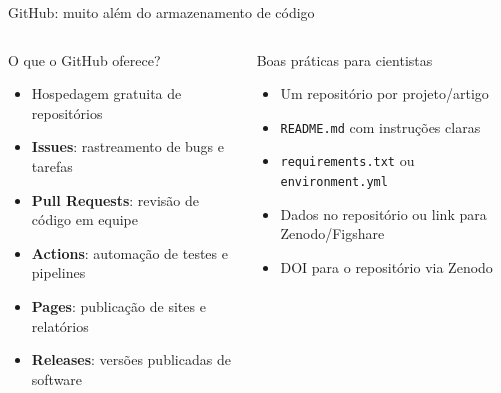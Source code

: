 \begin{frame}[shrink=15]{GitHub: muito além do armazenamento de código}
\begin{columns}
\begin{block}{O que o GitHub oferece?}
\begin{itemize}
    \item Hospedagem gratuita de repositórios
    \item \textbf{Issues}: rastreamento de bugs e tarefas
    \item \textbf{Pull Requests}: revisão de código em equipe
    \item \textbf{Actions}: automação de testes e pipelines
    \item \textbf{Pages}: publicação de sites e relatórios
    \item \textbf{Releases}: versões publicadas de software
\end{itemize}
\end{block}

\begin{exampleblock}{Boas práticas para cientistas}
\begin{itemize}
    \item Um repositório por projeto/artigo
    \item \texttt{README.md} com instruções claras
    \item \texttt{requirements.txt} ou \texttt{environment.yml}
    \item Dados no repositório ou link para Zenodo/Figshare
    \item DOI para o repositório via Zenodo
\end{itemize}
\end{exampleblock}
\end{columns}

\vspace{0.2cm}
\end{frame}

